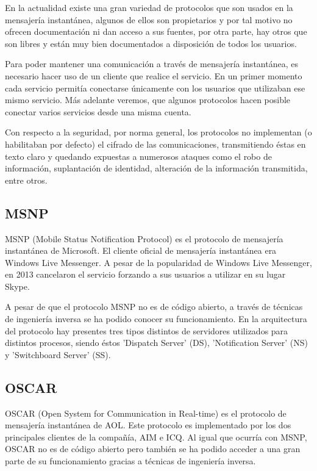 En la actualidad existe una gran variedad de protocolos que son usados en la mensajería instantánea, algunos de ellos son propietarios y por tal motivo no ofrecen documentación ni dan acceso a sus fuentes, por otra parte, hay otros que son libres y están muy bien documentados a disposición de todos los usuarios.

Para poder mantener una comunicación a través de mensajería instantánea, es necesario hacer uso de un cliente que realice el servicio. En un primer momento cada servicio permitía conectarse únicamente con los usuarios que utilizaban ese mismo servicio. Más adelante veremos, que algunos protocolos hacen posible conectar varios servicios desde una misma cuenta.

Con respecto a la seguridad, por norma general, los protocolos no implementan (o habilitaban por defecto) el cifrado de las comunicaciones, transmitiendo éstas en texto claro y quedando expuestas a numerosos ataques como el robo de información, suplantación de identidad, alteración de la información transmitida, entre otros.

\subsection{MSNP}

MSNP (Mobile Status Notification Protocol) es el protocolo de mensajería instantánea de Microsoft. El cliente oficial de mensajería instantánea era Windows Live Messenger. A pesar de la popularidad de Windows Live Messenger, en 2013 cancelaron el servicio forzando a sus usuarios a utilizar en su lugar Skype.

A pesar de que el protocolo MSNP no es de código abierto, a través de técnicas de ingeniería inversa se ha podido conocer su funcionamiento. En la arquitectura del protocolo hay presentes tres tipos distintos de servidores utilizados para distintos procesos, siendo éstos 'Dispatch Server' (DS), 'Notification Server' (NS) y 'Switchboard Server' (SS).

\subsection{OSCAR}

OSCAR (Open System for Communication in Real-time) es el protocolo de mensajería instantánea de AOL. Este protocolo es implementado por los dos principales clientes de la compañía, AIM e ICQ. Al igual que ocurría con MSNP, OSCAR no es de código abierto pero también se ha podido acceder a una gran parte de su funcionamiento gracias a técnicas de ingeniería inversa.

